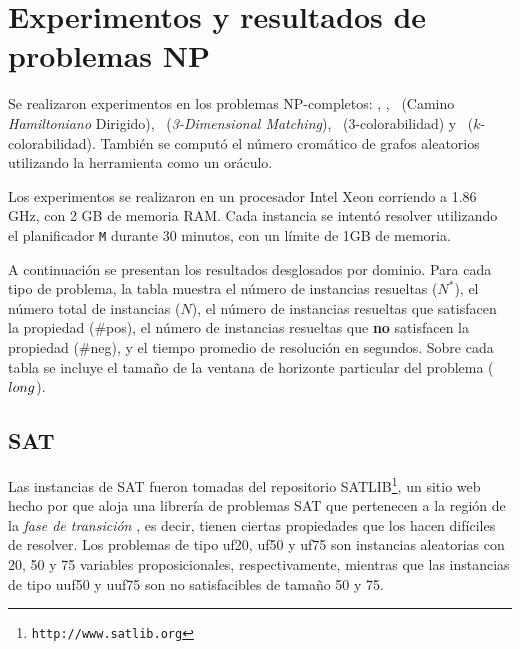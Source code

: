 \section{Experimentos y resultados de problemas NP}
Se realizaron experimentos en los problemas NP-completos: \SAT, \CLIQUE, \CHD
\ (Camino \textit{Hamiltoniano} Dirigido),
\TDM\ (\textit{3-Dimensional Matching}), \TCOL\ (3-colorabilidad) y \KCOL
\ ($k$-colorabilidad).
También se computó el número cromático de grafos aleatorios utilizando la
herramienta como un oráculo.

Los experimentos se realizaron en un procesador Intel Xeon corriendo a 1.86 GHz,
con 2 GB de memoria RAM. Cada instancia se intentó resolver utilizando el
planificador \texttt{M} durante 30 minutos, con un límite de 1GB de memoria.

A continuación se presentan los resultados desglosados por dominio.
Para cada tipo de problema, la tabla muestra el número de instancias resueltas
($N^*$), el número total de instancias ($N$), el número de instancias resueltas
que satisfacen la propiedad (\#pos), el número de instancias resueltas que
\textbf{no} satisfacen la propiedad (\#neg), y el tiempo promedio de resolución
en segundos. Sobre cada tabla se incluye el tamaño de la ventana de horizonte
particular del problema ($long$).

\subsection{SAT}
Las instancias de SAT fueron tomadas del repositorio
SATLIB\footnote{\texttt{http://www.satlib.org}}, un sitio web hecho por
\cite{hoos:satlib} que aloja una librería de problemas SAT que pertenecen a la
región de la \textit{fase de transición} \citep{gent:transition}, es decir,
tienen ciertas propiedades que los hacen difíciles de resolver.
Los problemas de tipo uf20, uf50 y uf75 son instancias aleatorias con 20, 50 y
75 variables proposicionales, respectivamente, mientras que las instancias de
tipo uuf50 y uuf75 son no satisfacibles de tamaño 50 y 75.

